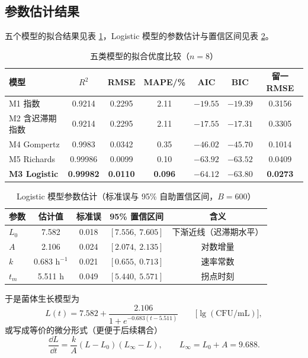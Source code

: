 \subsection{参数估计结果}
五个模型的拟合结果见表 \ref{tab:q1fit}，Logistic 模型的参数估计与置信区间见表 \ref{tab:q1par}。

\begin{table}[H]
\centering
\caption{五类模型的拟合优度比较（$n=8$）}
\label{tab:q1fit}
\small
\begin{tabular}{lcccccc}
\toprule
模型 & $R^2$ & RMSE & MAPE/\% & AIC & BIC & 留一 RMSE \\
\midrule
M1 指数            & 0.9214 & 0.2295 & 2.11 & $-19.55$ & $-19.39$ & 0.3156 \\
M2 含迟滞期指数    & 0.9214 & 0.2295 & 2.11 & $-17.55$ & $-17.31$ & 0.3305 \\
M4 Gompertz        & 0.9983 & 0.0342 & 0.35 & $-46.02$ & $-45.70$ & 0.1014 \\
M5 Richards        & 0.99986 & 0.0099 & 0.10 & $-63.92$ & $-63.52$ & 0.0409 \\
\textbf{M3 Logistic} & \textbf{0.99982} & \textbf{0.0110} & \textbf{0.096} & $\mathbf{-64.12}$ & $\mathbf{-63.80}$ & \textbf{0.0273} \\
\bottomrule
\end{tabular}
\end{table}

\begin{table}[H]
\centering
\caption{Logistic 模型参数估计（标准误与 95\% 自助置信区间，$B=600$）}
\label{tab:q1par}
\small
\begin{tabular}{lcccc}
\toprule
参数 & 估计值 & 标准误 & 95\% 置信区间 & 含义 \\
\midrule
$L_0$ & 7.582 & 0.018 & $[7.556,\ 7.605]$ & 下渐近线（迟滞期水平） \\
$A$   & 2.106 & 0.024 & $[2.074,\ 2.135]$ & 对数增量 \\
$k$   & 0.683 $\mathrm{h^{-1}}$ & 0.021 & $[0.655,\ 0.713]$ & 速率常数 \\
$t_m$ & 5.511 h & 0.049 & $[5.440,\ 5.571]$ & 拐点时刻 \\
\bottomrule
\end{tabular}
\end{table}

于是菌体生长模型为
\begin{equation}
L(t)=7.582+\frac{2.106}{1+e^{-0.683(t-5.511)}}\qquad \big[\lg(\mathrm{CFU/mL})\big],
\label{eq:logistic}
\end{equation}
或写成等价的微分形式（更便于后续耦合）
\begin{equation}
\frac{\dd L}{\dd t}=\frac{k}{A}(L-L_0)(L_\infty-L),\qquad L_\infty=L_0+A=9.688 .
\label{eq:logistic-ode}
\end{equation}

